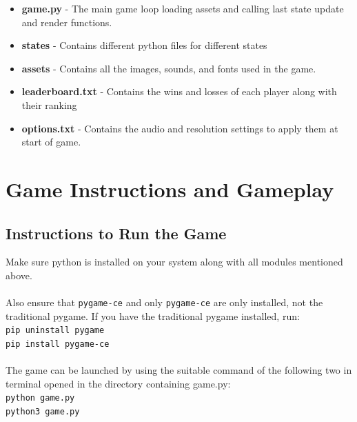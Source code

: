 \documentclass[10.5pt]{article}
\begin{document}

    \begin{itemize}
        \item \textbf{game.py} - The main game loop loading assets and calling last state update and render functions.
        \item \textbf{states} - Contains different python files for different states
        \item \textbf{assets} - Contains all the images, sounds, and fonts used in the game.
        \item \textbf{leaderboard.txt} - Contains the wins and losses of each player along with their ranking
        \item \textbf{options.txt} - Contains the audio and resolution settings to apply them at start of game.
    \end{itemize}
    
\vspace{1cm}
\section{Game Instructions and Gameplay}
\subsection{Instructions to Run the Game}
Make sure python is installed on your system along with all modules mentioned above. \\ \\
Also ensure that \texttt{pygame-ce} and only \texttt{pygame-ce} are only installed, not the traditional pygame.
    If you have the traditional pygame installed, run: \\
    \texttt{pip uninstall pygame} \\
    \texttt{pip install pygame-ce} \\ \\
The game can be launched by using the suitable command of the following two in terminal opened in the directory containing game.py: \\
    \texttt{python game.py} \\
    \texttt{python3 game.py} \\
\end{document}
